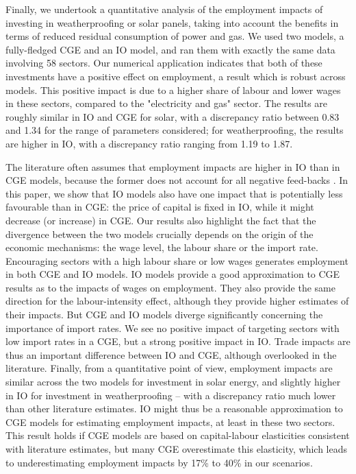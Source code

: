 Finally, we undertook a quantitative analysis of the employment impacts of investing in weatherproofing or  solar panels, taking into account the benefits in terms of reduced residual consumption of power and gas. We used two models, a fully-fledged CGE and an IO model, and ran them with exactly the same data involving 58 sectors.  
Our numerical application indicates that both of these investments have a positive effect on employment, a result which is robust across models. This positive impact is due to a higher share of labour and lower wages in these sectors, compared to the "electricity and gas" sector. The results are roughly similar in IO and CGE for solar, with a discrepancy ratio between 0.83 and 1.34 for the range of parameters considered; for weatherproofing, the results are higher in IO, with a discrepancy ratio ranging from 1.19 to 1.87.

The literature often assumes that employment impacts are higher in IO than in CGE models, because the former does not account for all negative feed-backs \citep{Partridge1998, Dwyer2005, OHara2013}. In this paper, we show that IO models also have one impact that is potentially less favourable than in CGE: the price of capital is fixed in IO, while it might decrease (or increase) in CGE.
Our results also highlight the fact that the divergence between the two models crucially depends on the origin of the economic mechanisms: the wage level, the labour share or the import rate.
Encouraging sectors with a high labour share or low wages generates employment in both CGE and IO models. IO models provide a good approximation to CGE results as to the impacts of wages on employment. They also provide the same direction for the labour-intensity effect, although they provide higher estimates of their impacts. 
But CGE and IO models diverge significantly concerning the importance of import rates. We see no positive impact of targeting sectors with low import rates in a CGE, but a strong positive impact in IO. Trade impacts are thus an important difference between IO and CGE, although overlooked in the literature.
Finally, from a quantitative point of view, employment impacts are similar across the two models for investment in solar energy, and slightly higher in IO for investment in weatherproofing -- with a discrepancy ratio much lower than other literature estimates. IO might thus be a reasonable approximation to CGE models for estimating employment impacts, at least in these two sectors. This result holds if CGE models are based on capital-labour elasticities consistent with literature estimates, but many CGE overestimate this elasticity, which leads to underestimating employment impacts by 17\% to 40\% in our scenarios. 

